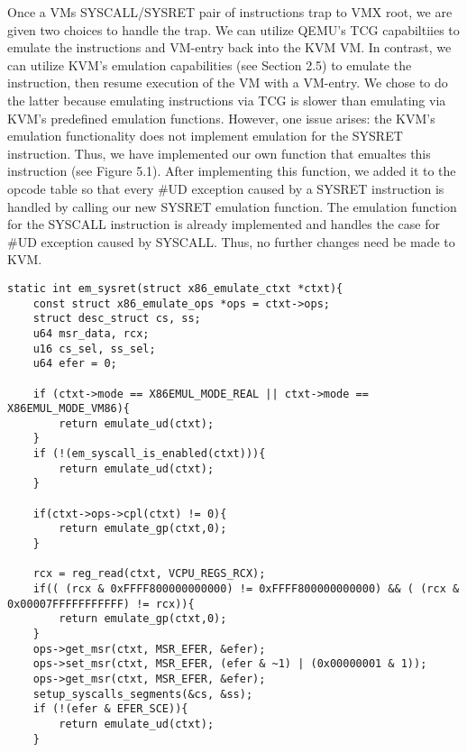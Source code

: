 \documentclass{report}
\begin{document}
\begin{spacing}{1.5}
{\large
Once a VMs SYSCALL/SYSRET pair of instructions trap to VMX root, we are given two choices to handle the trap. We can utilize QEMU's TCG capabiltiies to emulate the instructions and VM-entry back into the KVM VM. In contrast, we can utilize KVM's emulation capabilities (see Section 2.5) to emulate the instruction, then resume execution of the VM with a VM-entry. We chose to do the latter because emulating instructions via TCG is slower than emulating via KVM's predefined emulation functions. However, one issue arises: the KVM's emulation functionality does not implement emulation for the SYSRET instruction. Thus, we have implemented our own function that emualtes this instruction (see Figure 5.1). After implementing this function, we added it to the opcode table so that every \#UD exception caused by a SYSRET instruction is handled by calling our new SYSRET emulation function. The emulation function for the SYSCALL instruction is already implemented and handles the case for \#UD exception caused by SYSCALL. Thus, no further changes need be made to KVM. 
\newline
}











\begin{lstlisting}[caption={Emulation of SYSRET instruction},captionpos=b]
static int em_sysret(struct x86_emulate_ctxt *ctxt){
    const struct x86_emulate_ops *ops = ctxt->ops;
    struct desc_struct cs, ss;
    u64 msr_data, rcx;
    u16 cs_sel, ss_sel;
    u64 efer = 0;

    if (ctxt->mode == X86EMUL_MODE_REAL || ctxt->mode == X86EMUL_MODE_VM86){
        return emulate_ud(ctxt);
    }
    if (!(em_syscall_is_enabled(ctxt))){
        return emulate_ud(ctxt);
    }
    
    if(ctxt->ops->cpl(ctxt) != 0){
        return emulate_gp(ctxt,0);
    }
    
    rcx = reg_read(ctxt, VCPU_REGS_RCX);
    if(( (rcx & 0xFFFF800000000000) != 0xFFFF800000000000) && ( (rcx & 0x00007FFFFFFFFFFF) != rcx)){
        return emulate_gp(ctxt,0);
    }
    ops->get_msr(ctxt, MSR_EFER, &efer);
    ops->set_msr(ctxt, MSR_EFER, (efer & ~1) | (0x00000001 & 1));
    ops->get_msr(ctxt, MSR_EFER, &efer);
    setup_syscalls_segments(&cs, &ss);
    if (!(efer & EFER_SCE)){
        return emulate_ud(ctxt);
    }


\end{lstlisting}
\end{spacing}
\end{document}
